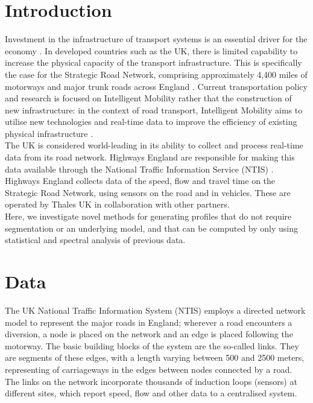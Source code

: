 \documentclass[conference]{IEEEtran}
\begin{document}
\section{Introduction}
Investment in the infrastructure of transport systems is an essential driver for the economy \cite{government}. 
In developed countries such as the UK, there is limited capability to increase the physical capacity of the transport infrastructure. 
This is specifically the case for the Strategic Road Network, comprising approximately 4,400 miles of motorways and major trunk roads across England \cite{Strategic}. 
Current transportation policy and research is focused on Intelligent Mobility rather that the construction of new infrastructure: in the context of road transport, Intelligent Mobility aims to utilise new technologies and real-time data to improve the efficiency of existing physical infrastructure \cite{needs}.\\

The UK is considered world-leading in its ability to collect and process real-time data from its road network. 
Highways England are responsible for making this data available through the National Traffic Information Service (NTIS) \cite{NTIS}. 
Highways England collects data of the speed, flow and travel time on the Strategic Road Network, using sensors on the road and in vehicles. 
These are operated by Thales UK in collaboration with other partners.\\

Here, we investigate novel methods for generating profiles that do not require segmentation or an underlying model, and that can be computed by only using statistical and spectral analysis of previous data.

\section{Data}
The UK National Traffic Information System (NTIS) employs a directed network model to represent the major roads in England; wherever a road encounters a diversion, a node is placed on the network and an edge is placed following the motorway. 
The basic building blocks of the system are the so-called links. 
They are segments of these edges, with a length varying between 500 and 2500 meters, representing of carriageways in the edges between nodes connected by a road. 
The links on the network incorporate thousands of induction loops (sensors) at different sites, which report speed, flow and other data to a centralised system.\\
\end{document}
